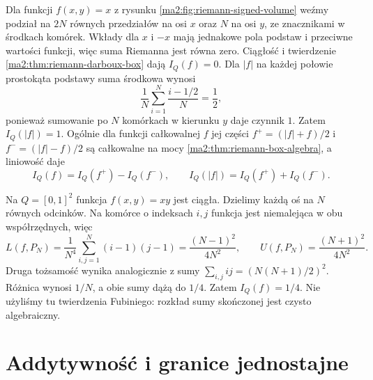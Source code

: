 \begin{przyklad}
\label{ma2:ex:riemann-signed-volume}
Dla funkcji $f(x,y)=x$ z rysunku
\ref{ma2:fig:riemann-signed-volume}
weźmy podział na $2N$ równych przedziałów
na osi $x$ oraz $N$ na osi $y$,
ze znacznikami w środkach komórek.
Wkłady dla $x$ i $-x$ mają jednakowe
pola podstaw i przeciwne wartości funkcji,
więc suma Riemanna jest równa zero.
Ciągłość i twierdzenie
\ref{ma2:thm:riemann-darboux-box}
dają $I_Q(f)=0$.
Dla $|f|$ na każdej połowie prostokąta
podstawy suma środkowa wynosi
\[
 \frac{1}{N}\sum_{i=1}^N\frac{i-1/2}{N}
 =\frac12,
\]
ponieważ sumowanie po $N$ komórkach
w kierunku $y$ daje czynnik $1$.
Zatem $I_Q(|f|)=1$.
Ogólnie dla funkcji całkowalnej $f$
jej części $f^+=(|f|+f)/2$ i
$f^-=(|f|-f)/2$ są całkowalne na mocy
\ref{ma2:thm:riemann-box-algebra},
a liniowość daje
\[
 I_Q(f)=I_Q(f^+)-I_Q(f^-),\qquad
 I_Q(|f|)=I_Q(f^+)+I_Q(f^-).
\]
\end{przyklad}

\begin{przyklad}
\label{ma2:ex:riemann-box-xy}
Na $Q=[0,1]^2$ funkcja $f(x,y)=xy$ jest ciągła.
Dzielimy każdą oś na $N$ równych odcinków.
Na komórce o indeksach $i,j$ funkcja jest
niemalejąca w obu współrzędnych, więc
\[
 L(f,P_N)=\frac{1}{N^4}
 \sum_{i,j=1}^N(i-1)(j-1)=\frac{(N-1)^2}{4N^2},
 \qquad
 U(f,P_N)=\frac{(N+1)^2}{4N^2}.
\]
Druga tożsamość wynika analogicznie z sumy
$\sum_{i,j}ij=(N(N+1)/2)^2$.
Różnica wynosi $1/N$, a obie sumy dążą
do $1/4$. Zatem $I_Q(f)=1/4$.
Nie użyliśmy tu twierdzenia Fubiniego:
rozkład sumy skończonej jest czysto algebraiczny.
\end{przyklad}

\section{Addytywność i granice jednostajne}

